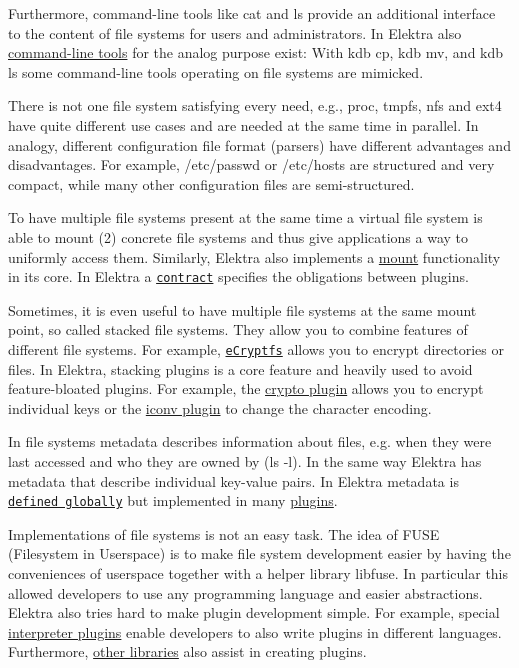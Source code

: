 Furthermore, command-\/line tools like {\ttfamily cat} and {\ttfamily ls} provide an additional interface to the content of file systems for users and administrators. In Elektra also \hyperlink{doc_help_kdb_md}{command-\/line tools} for the analog purpose exist\+: With {\ttfamily kdb cp}, {\ttfamily kdb mv}, and {\ttfamily kdb ls} some command-\/line tools operating on file systems are mimicked.

There is not one file system satisfying every need, e.\+g., {\ttfamily proc}, {\ttfamily tmpfs}, {\ttfamily nfs} and {\ttfamily ext4} have quite different use cases and are needed at the same time in parallel. In analogy, different configuration file format (parsers) have different advantages and disadvantages. For example, {\ttfamily /etc/passwd} or {\ttfamily /etc/hosts} are structured and very compact, while many other configuration files are semi-\/structured.

To have multiple file systems present at the same time a virtual file system is able to mount (2) concrete file systems and thus give applications a way to uniformly access them. Similarly, Elektra also implements a \hyperlink{doc_help_elektra-mounting_md}{mount} functionality in its core. In Elektra a \href{/home/markus/Projekte/Elektra/current/doc/CONTRACT.ini}{\tt contract} specifies the obligations between plugins.

Sometimes, it is even useful to have multiple file systems at the same mount point, so called {\ttfamily stacked} file systems. They allow you to combine features of different file systems. For example, \href{https://wiki.archlinux.org/index.php/ECryptfs}{\tt e\+Cryptfs} allows you to encrypt directories or files. In Elektra, stacking plugins is a core feature and heavily used to avoid feature-\/bloated plugins. For example, the \hyperlink{md_src_plugins_crypto_README_src_plugins_crypto_README_md}{crypto plugin} allows you to encrypt individual keys or the \hyperlink{md_src_plugins_iconv_README_src_plugins_iconv_README_md}{iconv plugin} to change the character encoding.

In file systems metadata describes information about files, e.\+g. when they were last accessed and who they are owned by ({\ttfamily ls -\/l}). In the same way Elektra has metadata that describe individual key-\/value pairs. In Elektra metadata is \href{/home/markus/Projekte/Elektra/current/doc/METADATA.ini}{\tt defined globally} but implemented in many \hyperlink{src_plugins_README_md}{plugins}.

Implementations of file systems is not an easy task. The idea of F\+U\+SE (Filesystem in Userspace) is to make file system development easier by having the conveniences of userspace together with a helper library {\ttfamily libfuse}. In particular this allowed developers to use any programming language and easier abstractions. Elektra also tries hard to make plugin development simple. For example, special \hyperlink{src_plugins_README_md}{interpreter plugins} enable developers to also write plugins in different languages. Furthermore, \hyperlink{src_libs_README_md}{other libraries} also assist in creating plugins.

